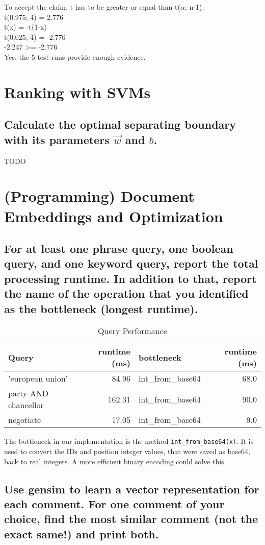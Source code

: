 \documentclass{scrartcl}
\begin{document}
To accept the claim, t has to be greater or equal than t($\alpha$; n-1).\\

t(0.975; 4) = 2.776\\
t(x) = -t(1-x)\\
t(0.025; 4) = -2.776\\

-2.247 >= -2.776\\

Yes, the 5 test runs provide enough evidence.


\section{Ranking with SVMs}

\subsection{Calculate the optimal separating boundary with its parameters $\vec{w}$ and $b$.}

TODO


\section{(Programming) Document Embeddings and Optimization}

\subsection{For at least one phrase query, one boolean query, and one keyword query, report the total processing runtime. In addition to that, report the name of the operation that you identified as the bottleneck (longest runtime).}

\begin{table}[h]
	\centering
	\caption{Query Performance}
	\begin{tabular}{l|r|l|r}
		Query                & runtime (ms) & bottleneck         & runtime (ms)  \\ \hline
		'european union'     &        84.96 & int\_from\_base64  & 68.0  \\
		party AND chancellor &       162.31 & int\_from\_base64  & 90.0  \\
		negotiate            &        17.05 & int\_from\_base64  &  9.0  \\
	\end{tabular}
\end{table}

The bottleneck in our implementation is the method \texttt{int\_from\_base64(x)}. It is used to convert the IDs and position integer values, that were saved as base64, back to real integers. A more efficient binary encoding could solve this.

\subsection{Use gensim to learn a vector representation for each comment. For one comment of your choice, find the most similar comment (not the exact same!) and print both.}
\end{document}
